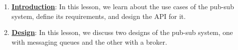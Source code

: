 \begin{enumerate}
\item
\protect{}\label{DQI2WdVshHigKU6LurAv_}
\href{https://www.educative.io/courses/grokking-the-system-design-interview/introduction-to-pub-sub}{\textbf{Introduction}}: In this lesson, we learn about the use cases of the pub-sub system, define its requirements, and design the API for it.
\item
\protect{}\label{z3p_EHd-Vpc_Y_7oMLWmb}
\href{https://www.educative.io/courses/grokking-the-system-design-interview/design-of-a-pub-sub-system}{\textbf{Design}}: In this lesson, we discuss two designs of the pub-sub system, one with messaging queues and the other with a broker.
\end{enumerate}

